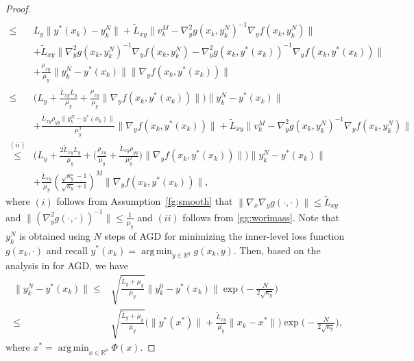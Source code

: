 \documentclass{osudissert96}
\DeclareMathOperator*{\argmin}{arg\,min}
\begin{document}
\begin{proof}
{\begin{align}
\\\leq & L_y \|y^*(x_k)-y_k^N\| + \widetilde L_{xy} \|v_k^M- \nabla_y^2 g(x_k,y_k^N)^{-1}\nabla_y f( x_k,y^N_k) \| \nonumber
\\&+ \widetilde L_{xy}\big\|\nabla_y^2 g(x_k,y_k^N)^{-1}\nabla_y f( x_k,y^N_k)-\nabla_y^2 g(x_k,y^*(x_k))^{-1}\nabla_y f(x_k,y^*(x_k)) \big\|\nonumber
\\&+\frac{\rho_{xy}}{\mu_y} \|y_k^N-y^*(x_k)\| \|\nabla_y f( x_k,y^*(x_k)) \|\nonumber
\\\leq & \Big(L_y +\frac{\widetilde L_{xy}L_y}{\mu_y} +\frac{\rho_{xy}}{\mu_y}\|\nabla_y f( x_k,y^*(x_k)) \|\Big)\|y_k^N-y^*(x_k)\|  \nonumber
\\&+ \frac{\widetilde L_{xy}\rho_{yy}\|y_k^N-y^*(x_k)\|}{\mu_y^2}\|\nabla_y f( x_k,y^*(x_k)) \| + \widetilde L_{xy} \|v_k^M- \nabla_y^2 g(x_k,y_k^N)^{-1}\nabla_y f( x_k,y^N_k) \|  \nonumber
\\\overset{(ii)}\leq&\Big(L_y +\frac{2\widetilde L_{xy}L_y}{\mu_y} +\Big(\frac{\rho_{xy}}{\mu_y}+\frac{\widetilde L_{xy}\rho_{yy}}{\mu_y^2}\Big)\|\nabla_y f( x_k,y^*(x_k)) \|\Big)\|y_k^N-y^*(x_k)\|  \nonumber
\\&+\frac{\widetilde L_{xy}}{\mu_y}\left(\frac{\sqrt{\kappa_y}-1}{\sqrt{\kappa_y}+1}\right)^M\|\nabla_y f( x_k,y^*(x_k))\|,
\end{align}}
\hspace{-0.14cm}where $(i)$ follows from Assumption~\ref{fg:smooth} that $\|\nabla_x\nabla_y g(\cdot,\cdot)\|\leq \widetilde L_{xy}$ and $\|(\nabla_y^2 g(\cdot,\cdot))^{-1}\|\leq \frac{1}{\mu_y}$ and $(ii)$ follows from \cref{gg:worimass}. Note that $y_k^N$ is obtained using $N$ steps of AGD for minimizing the inner-level loss function $g(x_k,\cdot)$ and recall $y^*(x_k)=\argmin_{y\in\mathbb{R}^q} g( x_k,y)$. Then, based on the analysis in \cite{nesterov2003introductory} for AGD, we have 
\begin{align}\label{eq:ideazhiqian}
\|y_k^N-y^*(x_k)\|\leq &\sqrt{ \frac{\widetilde L_y +\mu_y}{\mu_y} }\|y_k^0-y^*(x_k)\| \exp\Big(-\frac{N}{2\sqrt{\kappa_y}}\Big) \nonumber
\\\leq & \sqrt{\frac{\widetilde L_y +\mu_y}{\mu_y}} \Big(\|y^*(x^*)\| + \frac{\widetilde L_{xy}}{\mu_y}\|x_k-x^*\|\Big) \exp\Big(-\frac{N}{2\sqrt{\kappa_y}}\Big), 
\end{align}
where $x^*=\argmin_{x\in\mathbb{R}^p}\Phi(x)$. 

\end{proof}
\end{document}
